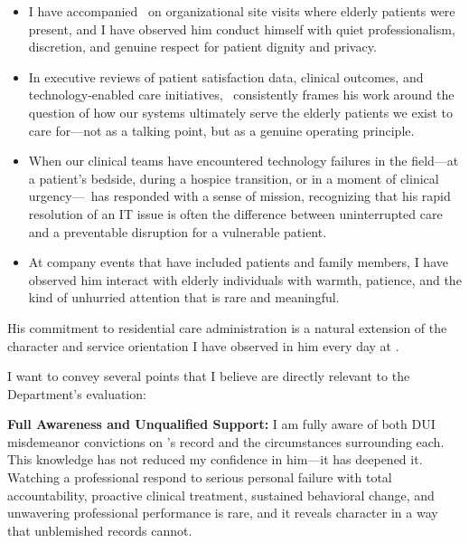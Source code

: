 \begin{itemize}[leftmargin=2em, itemsep=0.2em]
  \item I have accompanied \ApplicantName\ on organizational site visits where elderly patients were present, and I have observed him conduct himself with quiet professionalism, discretion, and genuine respect for patient dignity and privacy.
  \item In executive reviews of patient satisfaction data, clinical outcomes, and technology-enabled care initiatives, \ApplicantName\ consistently frames his work around the question of how our systems ultimately serve the elderly patients we exist to care for---not as a talking point, but as a genuine operating principle.
  \item When our clinical teams have encountered technology failures in the field---at a patient's bedside, during a hospice transition, or in a moment of clinical urgency---\ApplicantName\ has responded with a sense of mission, recognizing that his rapid resolution of an IT issue is often the difference between uninterrupted care and a preventable disruption for a vulnerable patient.
  \item At company events that have included patients and family members, I have observed him interact with elderly individuals with warmth, patience, and the kind of unhurried attention that is rare and meaningful.
\end{itemize}

His commitment to residential care administration is a natural extension of the character and service orientation I have observed in him every day at \EmployerName.


I want to convey several points that I believe are directly relevant to the Department's evaluation:

\textbf{Full Awareness and Unqualified Support:} I am fully aware of both DUI misdemeanor convictions on \ApplicantName's record and the circumstances surrounding each. This knowledge has not reduced my confidence in him---it has deepened it. Watching a professional respond to serious personal failure with total accountability, proactive clinical treatment, sustained behavioral change, and unwavering professional performance is rare, and it reveals character in a way that unblemished records cannot.

